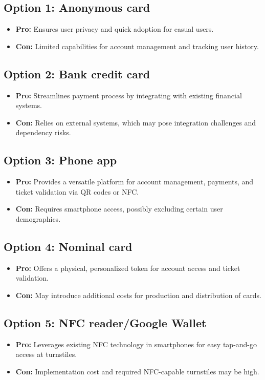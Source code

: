 \subsection*{Option 1: Anonymous card}
\begin{itemize}
    \item \textbf{Pro:} Ensures user privacy and quick adoption for casual users.
    \item \textbf{Con:} Limited capabilities for account management and tracking user history.
\end{itemize}

\subsection*{Option 2: Bank credit card}
\begin{itemize}
    \item \textbf{Pro:} Streamlines payment process by integrating with existing financial systems.
    \item \textbf{Con:} Relies on external systems, which may pose integration challenges and dependency risks.
\end{itemize}

\subsection*{Option 3: Phone app}
\begin{itemize}
    \item \textbf{Pro:} Provides a versatile platform for account management, payments, and ticket validation via QR codes or NFC.
    \item \textbf{Con:} Requires smartphone access, possibly excluding certain user demographics.
\end{itemize}

\subsection*{Option 4: Nominal card}
\begin{itemize}
    \item \textbf{Pro:} Offers a physical, personalized token for account access and ticket validation.
    \item \textbf{Con:} May introduce additional costs for production and distribution of cards.
\end{itemize}

\subsection*{Option 5: NFC reader/Google Wallet}
\begin{itemize}
    \item \textbf{Pro:} Leverages existing NFC technology in smartphones for easy tap-and-go access at turnstiles.
    \item \textbf{Con:} Implementation cost and required NFC-capable turnstiles may be high.
\end{itemize}

